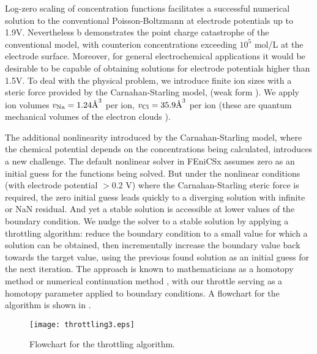 Log-zero scaling of concentration functions facilitates a successful numerical solution to
the conventional Poisson-Boltzmann at electrode potentials
up to 1.9V. Nevertheless b demonstrates the
point charge catastrophe of the conventional model, with counterion
concentrations exceeding $10^{5}$ mol/L at the electrode
surface. Moreover, for general electrochemical applications it would
be desirable to be capable of obtaining solutions for electrode
potentials higher than 1.5V. To deal with the physical problem, we
introduce finite ion sizes with a steric force provided by the
Carnahan-Starling model,  (weak form
).  We apply ion volumes
$v_{\ce{Na}}=1.24 \textrm{\AA}^{3}$ per  ion,
$v_{\ce{Cl}}=35.9 \textrm{\AA}^{3}$ per  ion (these are
quantum mechanical volumes of the electron clouds \citep{ParsonsNinham2009}).

The additional nonlinearity introduced by the Carnahan-Starling model,
where the chemical potential depends on the concentrations being
calculated, introduces a new challenge. The default nonlinear solver
in FEniCSx assumes zero as an initial guess for the functions being
solved. But under the nonlinear conditions (with electrode potential
$>0.2$ V) where the Carnahan-Starling steric force is required, the
zero initial guess leads quickly to a diverging solution with infinite
or NaN
residual. And yet a stable solution is accessible at lower values of
the boundary condition. We nudge the solver to a stable solution by
applying a throttling algorithm: reduce the boundary condition to a
small value for which a solution can be obtained, then incrementally
increase the boundary value back towards the target value, using the
previous found solution as an initial guess for the next
iteration. The approach is known to mathematicians as a homotopy
method \citep{homotopy_analysis_Liao2012}
or numerical continuation method \citep{allgower1990numerical},
with our throttle serving as a homotopy parameter applied to boundary
conditions.  A flowchart for the algorithm is shown in
.

\begin{figure}
\centering
\texttt{[image: throttling3.eps]}
\caption{Flowchart for the throttling algorithm. }
\label{fig:throttling_algorithm}
\end{figure}

